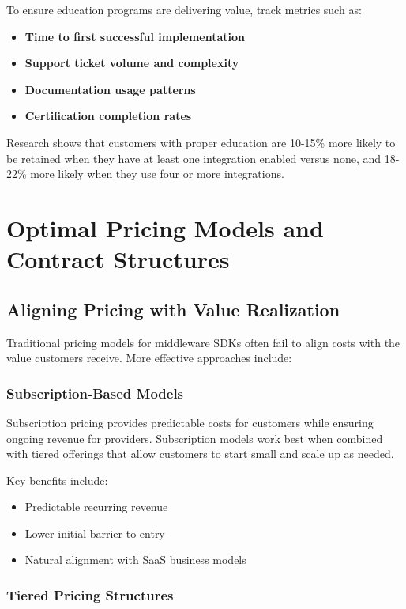 \documentclass[11pt,a4paper]{article}
\begin{document}
To ensure education programs are delivering value, track metrics such as:

\begin{itemize}
    \item \textbf{Time to first successful implementation}
    \item \textbf{Support ticket volume and complexity}
    \item \textbf{Documentation usage patterns}
    \item \textbf{Certification completion rates}
\end{itemize}

Research shows that customers with proper education are 10-15\% more likely to be retained when they have at least one integration enabled versus none, and 18-22\% more likely when they use four or more integrations.

\section{Optimal Pricing Models and Contract Structures}

\subsection{Aligning Pricing with Value Realization}

Traditional pricing models for middleware SDKs often fail to align costs with the value customers receive. More effective approaches include:

\subsubsection{Subscription-Based Models}

Subscription pricing provides predictable costs for customers while ensuring ongoing revenue for providers. Subscription models work best when combined with tiered offerings that allow customers to start small and scale up as needed.

Key benefits include:
\begin{itemize}
    \item Predictable recurring revenue
    \item Lower initial barrier to entry
    \item Natural alignment with SaaS business models
\end{itemize}

\subsubsection{Tiered Pricing Structures}
\end{document}
